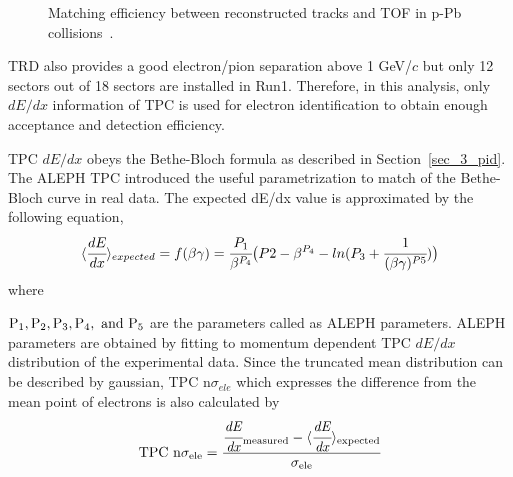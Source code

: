 {\begin{figure}[!h]
  \caption{Matching efficiency between reconstructed tracks and TOF in p-Pb collisions~\cite{bib_aprrun1}. }
  \label{fig_4_tofmatch}
\end{figure}
TRD also provides a good electron/pion separation above 1 GeV/$c$ but only 12 sectors out of 18 sectors are installed in Run1. 
Therefore, in this analysis, only $dE/dx$ information of TPC is used for electron identification to obtain enough acceptance and detection efficiency. 

TPC $dE/dx$ obeys the Bethe-Bloch formula as described in Section~\ref{sec_3_pid}. 
The ALEPH TPC introduced the useful parametrization to match of the Bethe-Bloch curve in real data. 
The expected dE/dx value is approximated by the following equation, 
\begin{equation}
  \langle \cfrac{dE}{dx} \rangle_{expected} = f(\beta \gamma) = \cfrac{P_{1}}{\beta^{P_{4}}}\big( P2-\beta^{P_{4}}-ln(P_{3}+\cfrac{1}{(\beta\gamma)^{P5}}) \bigr)
\end{equation}
where {$\rm{P_{1}, P_{2}, P_{3}, P_{4}, ~and~P_{5}}$ are the parameters called as ALEPH parameters. 
ALEPH parameters are obtained by fitting to momentum dependent TPC $dE/dx$ distribution of the experimental data.
Since the truncated mean distribution can be described by gaussian, TPC n$\sigma_{ele}$ which expresses the difference from the mean point of electrons is also calculated by 
\begin{equation}
  \rm{TPC~n}\sigma_{\rm{ele}} = \cfrac{\cfrac{\it{dE}}{\it{dx}}_{\rm{measured}} - \langle \cfrac{\it{dE}}{\it{dx}} \rangle_{\rm{expected}} }{\sigma_{\rm{ele}}}
\end{equation}

}}
